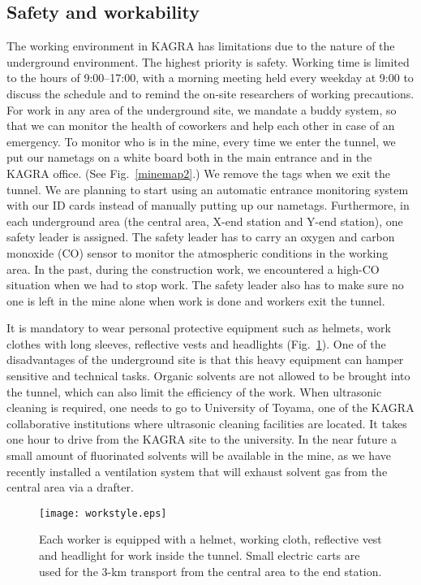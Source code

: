 \documentclass[prd ,twocolumn ,secnumarabic,dvips
,amssymb, amsmath,nobibnotes, aps, prd,superscriptaddress]{revtex4-1}
\begin{document}
{\subsection{Safety and workability}
%
The working environment in KAGRA has limitations due to the nature of the underground environment. The highest priority is safety. Working time is limited to the hours of 9:00--17:00, with a morning meeting held every weekday at 9:00 to discuss the schedule and to remind the on-site researchers of working precautions. For work in any area of the underground site, we mandate a buddy system, so that we can monitor the health of coworkers and help each other in case of an emergency. To monitor who is in the mine, every time we enter the tunnel, we put our nametags on a white board both in the main entrance and in the KAGRA office. (See Fig.~\ref{minemap2}.) We remove the tags when we exit the tunnel. We are planning to start using an automatic entrance monitoring system with our ID cards instead of manually putting up our nametags. Furthermore, in each underground area (the central area, X-end station and Y-end station), one safety leader is assigned. The safety leader has to carry an oxygen and carbon monoxide (CO) sensor to monitor the atmospheric conditions in the working area. In the past, during the construction work, we encountered a high-CO situation when we had to stop work. The safety leader also has to make sure no one is left in the mine alone when work is done and workers exit the tunnel.

It is mandatory to wear personal protective equipment such as helmets, work clothes with long sleeves, reflective vests and headlights (Fig.~\ref{fig:workstyle}). One of the disadvantages of the underground site is that this heavy equipment can hamper sensitive and technical tasks. Organic solvents are not allowed to be brought into the tunnel, which can also limit the efficiency of the work. When ultrasonic cleaning is required, one needs to go to University of Toyama, one of the KAGRA collaborative institutions where ultrasonic cleaning facilities are located. It takes one hour to drive from the KAGRA site to the university. In the near future a small amount of fluorinated solvents will be available in the mine, as we have recently installed a ventilation system that will exhaust solvent gas from the central area via a drafter.

\begin{figure}[htbp]
\begin{center}
\texttt{[image: workstyle.eps]}
\caption{Each worker is equipped with a helmet, working cloth, reflective vest and headlight for work inside the tunnel. Small electric carts are used for the 3-km transport from the central area to the end station.}
\label{fig:workstyle}
\end{center}
\end{figure}

}
\end{document}
